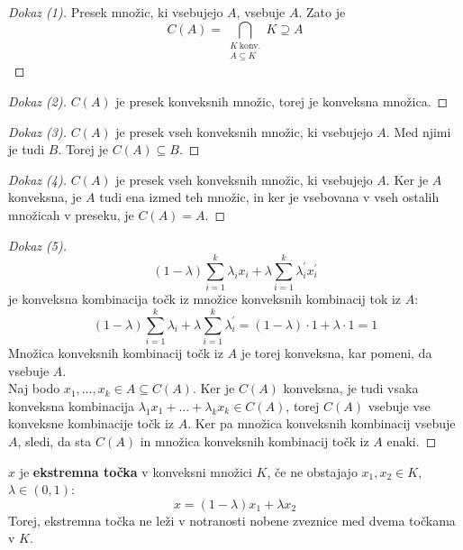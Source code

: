 \documentclass[11pt, a4paper]{article}
\begin{document}
    \begin{proof}[Dokaz \emph{(1)}]
        Presek množic, ki vsebujejo \(A\), vsebuje \(A\). Zato je 
        \[
            C(A)=\bigcap_{\substack{K\ \text{konv.} \\ A \subseteq K}} K \supseteq A  
        \]
    \end{proof}

    \begin{proof}[Dokaz \emph{(2)}]
        \(C(A)\) je presek konveksnih množic, torej je konveksna množica.
    \end{proof}

    \begin{proof}[Dokaz \emph{(3)}]
        \(C(A)\) je presek vseh konveksnih množic, ki vsebujejo \(A\). Med njimi je tudi \(B\). Torej je \(C(A) \subseteq B\).
    \end{proof}

    \begin{proof}[Dokaz \emph{(4)}]
        \(C(A)\) je presek vseh konveksnih množic, ki vsebujejo \(A\). Ker je \(A\) konveksna, je \(A\) tudi ena izmed teh množic, in ker je vsebovana v vseh ostalih množicah v preseku, je \(C(A)=A\).
    \end{proof}

    \begin{proof}[Dokaz \emph{(5)}]
        \[
            (1-\lambda) \sum_{i=1}^k \lambda_i x_i + \lambda \sum_{i=1}^k \lambda_i^\prime x_i^\prime    
        \]
        je konveksna kombinacija točk iz množice konveksnih kombinacij tok iz \(A\):
        \[
            (1-\lambda) \sum_{i=1}^k \lambda_i + \lambda \sum_{i=1}^k \lambda_i^\prime = (1-\lambda) \cdot 1 + \lambda \cdot 1 = 1    
        \]
        Množica konveksnih kombinacij točk iz \(A\) je torej konveksna, kar pomeni, da vsebuje \(A\). \\
        Naj bodo \(x_1,...,x_k \in A \subseteq C(A)\). Ker je \(C(A)\) konveksna, je tudi vsaka konveksna kombinacija \(\lambda_1 x_1 + ... + \lambda_k x_k \in C(A)\), torej \(C(A)\) vsebuje vse konveksne kombinacije točk iz \(A\). Ker pa množica konveksnih kombinacij vsebuje \(A\), sledi, da sta \(C(A)\) in množica konveksnih kombinacij točk iz \(A\) enaki.
    \end{proof}

    \begin{definition}
        \(x\) je \textbf{ekstremna točka} v konveksni množici \(K\), če ne obstajajo \(x_1,x_2 \in K\), \(\lambda \in (0,1)\):
        \[
            x = (1-\lambda) x_1 + \lambda x_2    
        \]
        Torej, ekstremna točka ne leži v notranosti nobene zveznice med dvema točkama v \(K\).
    \end{definition}
\end{document}
